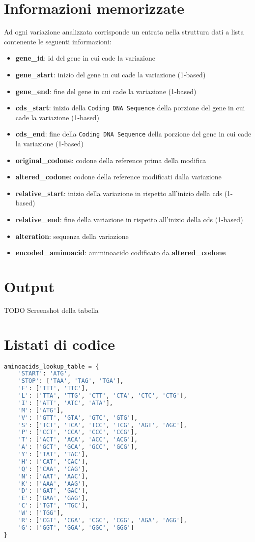 \documentclass[11pt,italian]{article}
\begin{document}
\section{Informazioni memorizzate}
Ad ogni variazione analizzata corrisponde un entrata nella struttura dati a lista contenente le seguenti informazioni:
\begin{itemize}
    \item \textbf{gene\_id}: id del gene in cui cade la variazione
    \item \textbf{gene\_start}: inizio del gene in cui cade la variazione (1-based)
    \item \textbf{gene\_end}: fine del gene in cui cade la variazione (1-based)
    \item \textbf{cds\_start}: inizio della \lstinline{Coding DNA Sequence} della porzione del gene in cui cade la variazione (1-based)
    \item \textbf{cds\_end}: fine della \lstinline{Coding DNA Sequence} della porzione del gene in cui cade la variazione (1-based)
    \item \textbf{original\_codone}: codone della reference prima della modifica
    \item \textbf{altered\_codone}: codone della reference modificati dalla variazione
    \item \textbf{relative\_start}: inizio della variazione in rispetto all'inizio della cds (1-based)
    \item \textbf{relative\_end}: fine della variazione in rispetto all'inizio della cds (1-based)
    \item \textbf{alteration}: sequenza della variazione
    \item \textbf{encoded\_aminoacid}: amminoacido codificato da \textbf{altered\_codone}
\end{itemize}

\newpage
\section{Output}

TODO Screenshot della tabella

\newpage
\section{Listati di codice}
\begin{lstlisting}[language=Python,caption=Tabella per la traduzione in amminoacidi,label=code:aminoacids_table]
aminoacids_lookup_table = {
    'START': 'ATG',
    'STOP': ['TAA', 'TAG', 'TGA'],
    'F': ['TTT', 'TTC'],
    'L': ['TTA', 'TTG', 'CTT', 'CTA', 'CTC', 'CTG'],
    'I': ['ATT', 'ATC', 'ATA'],
    'M': ['ATG'],
    'V': ['GTT', 'GTA', 'GTC', 'GTG'],
    'S': ['TCT', 'TCA', 'TCC', 'TCG', 'AGT', 'AGC'],
    'P': ['CCT', 'CCA', 'CCC', 'CCG'],
    'T': ['ACT', 'ACA', 'ACC', 'ACG'],
    'A': ['GCT', 'GCA', 'GCC', 'GCG'],
    'Y': ['TAT', 'TAC'],
    'H': ['CAT', 'CAC'],
    'Q': ['CAA', 'CAG'],
    'N': ['AAT', 'AAC'],
    'K': ['AAA', 'AAG'],
    'D': ['GAT', 'GAC'],
    'E': ['GAA', 'GAG'],
    'C': ['TGT', 'TGC'],
    'W': ['TGG'],
    'R': ['CGT', 'CGA', 'CGC', 'CGG', 'AGA', 'AGG'],
    'G': ['GGT', 'GGA', 'GGC', 'GGG']
}
\end{lstlisting}
\end{document}
